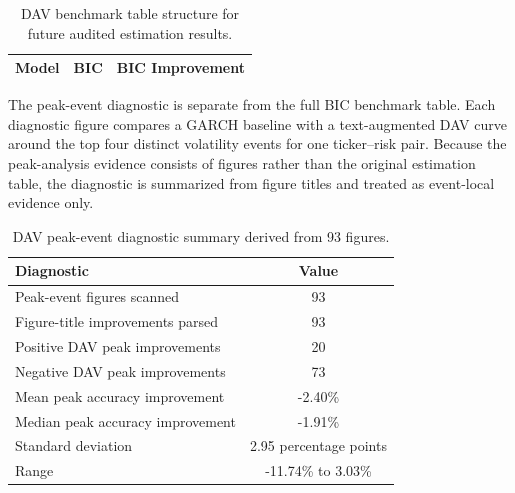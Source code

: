\documentclass[11pt, a4paper]{article}
\begin{document}
\begin{table}[H]
\centering
\caption{DAV benchmark table structure for future audited estimation results.}
\label{tab:dav_batch_template}
\vspace{0.2cm}
\renewcommand{\arraystretch}{1.15}
\begin{tabular}{lll}
\toprule
\textbf{Model} & \textbf{BIC} & \textbf{BIC Improvement} \\
\midrule
\bottomrule
\end{tabular}
\end{table}

The peak-event diagnostic is separate from the full BIC benchmark table. Each diagnostic figure compares a GARCH baseline with a text-augmented DAV curve around the top four distinct volatility events for one ticker--risk pair. Because the peak-analysis evidence consists of figures rather than the original estimation table, the diagnostic is summarized from figure titles and treated as event-local evidence only.

\begin{table}[H]
\centering
\caption{DAV peak-event diagnostic summary derived from 93 figures.}
\label{tab:dav_peak_summary}
\vspace{0.2cm}
\renewcommand{\arraystretch}{1.18}
\begin{tabular}{lc}
\toprule
\textbf{Diagnostic} & \textbf{Value} \\
\midrule
Peak-event figures scanned & 93 \\
Figure-title improvements parsed & 93 \\
Positive DAV peak improvements & 20 \\
Negative DAV peak improvements & 73 \\
Mean peak accuracy improvement & -2.40\% \\
Median peak accuracy improvement & -1.91\% \\
Standard deviation & 2.95 percentage points \\
Range & -11.74\% to 3.03\% \\
\bottomrule
\end{tabular}
\end{table}
\end{document}
